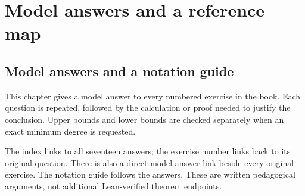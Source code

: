 \documentclass[11pt,a4paper,oneside,openany]{book}
\theoremstyle{definition}\newtheorem{definition}[theorem]{Definition}
\theoremstyle{remark}\newtheorem{remark}[theorem]{Remark}
\numberwithin{equation}{chapter}
\begin{document}
\part{Model answers and a reference map}

\chapter{Model answers and a notation guide}\label{tx:ch:solutions}
This chapter gives a model answer to every numbered exercise in the book.
Each question is repeated, followed by the calculation or proof needed
to justify the conclusion. Upper bounds and lower bounds are checked
separately when an exact minimum degree is requested.

The index links to all seventeen answers; the exercise number links
back to its original question. There is also a direct model-answer
link beside every original exercise. The notation guide follows the
answers. These are written pedagogical arguments, not additional
Lean-verified theorem endpoints.
\end{document}
